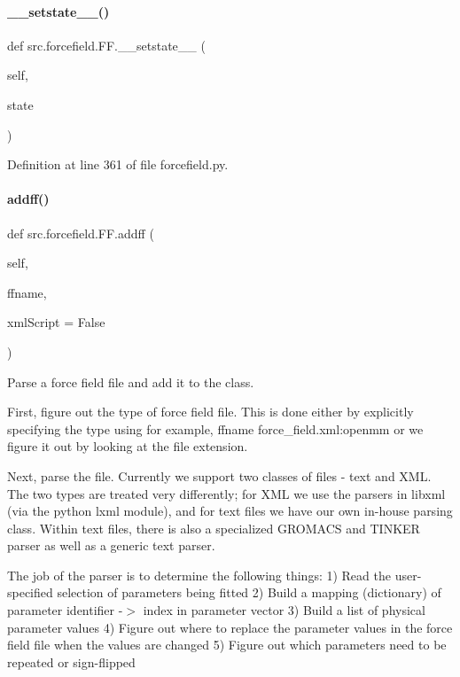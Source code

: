 \paragraph{\texorpdfstring{\+\_\+\+\_\+setstate\+\_\+\+\_\+()}{\_\_setstate\_\_()}}
{\footnotesize\ttfamily def src.\+forcefield.\+F\+F.\+\_\+\+\_\+setstate\+\_\+\+\_\+ (\begin{DoxyParamCaption}\item[{}]{self,  }\item[{}]{state }\end{DoxyParamCaption})}



Definition at line 361 of file forcefield.\+py.

\mbox{\label{classsrc_1_1forcefield_1_1FF_ae1092a94c188af5bb65da2bb3ac89c5f}} 
\paragraph{\texorpdfstring{addff()}{addff()}}
{\footnotesize\ttfamily def src.\+forcefield.\+F\+F.\+addff (\begin{DoxyParamCaption}\item[{}]{self,  }\item[{}]{ffname,  }\item[{}]{xml\+Script = {\ttfamily False} }\end{DoxyParamCaption})}



Parse a force field file and add it to the class. 

First, figure out the type of force field file. This is done either by explicitly specifying the type using for example, {\ttfamily  ffname force\+\_\+field.\+xml\+:openmm } or we figure it out by looking at the file extension.

Next, parse the file. Currently we support two classes of files -\/ text and X\+ML. The two types are treated very differently; for X\+ML we use the parsers in libxml (via the python lxml module), and for text files we have our own in-\/house parsing class. Within text files, there is also a specialized G\+R\+O\+M\+A\+CS and T\+I\+N\+K\+ER parser as well as a generic text parser.

The job of the parser is to determine the following things\+: 1) Read the user-\/specified selection of parameters being fitted 2) Build a mapping (dictionary) of {\ttfamily  parameter identifier -\/$>$ index in parameter vector } 3) Build a list of physical parameter values 4) Figure out where to replace the parameter values in the force field file when the values are changed 5) Figure out which parameters need to be repeated or sign-\/flipped

